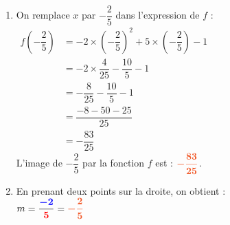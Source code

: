 \documentclass[a4paper,11pt]{article}
\begin{document}
\begin{seance}{} %
\begin{enumerate}
 \item On remplace $x$ par $-\dfrac{2}{5}$ dans l'expression de $f$ :\\
     
    $\begin{aligned}
    f\left(-\dfrac{2}{5}\right)&=-2\times \left(-\dfrac{2}{5}\right)^2+5\times \left(-\dfrac{2}{5}\right)-1\\
    &=-2\times\dfrac{4}{25}-\dfrac{10}{5}-1\\
    &=-\dfrac{8}{25}-\dfrac{10}{5}-1\\
    &=\dfrac{-8-50-25}{25}\\
    &=-\dfrac{83}{25}
    \end{aligned}$\\
    
    L'image de $-\dfrac{2}{5}$ par la fonction $f$ est : ${\color[HTML]{f15929}\boldsymbol{-\dfrac{83}{25}}}$.
\item En prenant deux points sur la droite, on obtient :\\
     
    $m=\dfrac{{\color{blue}\boldsymbol{-2}}}{{\color{red}\boldsymbol{5}}}={\color[HTML]{f15929}\boldsymbol{-\dfrac{2}{5}}}$\\\begin{tikzpicture}[baseline,scale = 0.75]


\end{tikzpicture}
\end{enumerate}
\end{seance}
\end{document}
